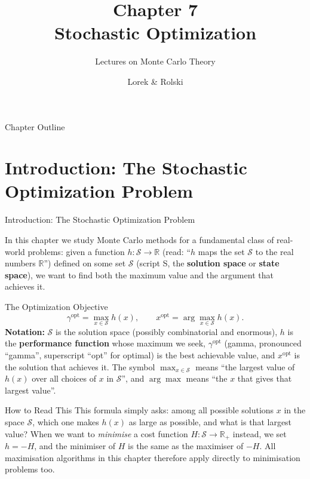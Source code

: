 \documentclass[aspectratio=169,10pt]{beamer}
\title[Ch.7 Stochastic Optimization]{Chapter 7\\Stochastic Optimization}
\subtitle{Lectures on Monte Carlo Theory}
\author{Lorek \& Rolski}
\date{}
\newcommand{\R}{\mathbb{R}}
\newcommand{\calS}{\mathcal{S}}
\begin{document}
\begin{frame}
  \titlepage
\end{frame}

\begin{frame}{Chapter Outline}
  \tableofcontents
\end{frame}

\section{Introduction: The Stochastic Optimization Problem}

\begin{frame}[allowframebreaks]{Introduction: The Stochastic Optimization Problem}

In this chapter we study Monte Carlo methods for a fundamental class of
real-world problems: given a function $h : \calS \to \R$ (read: ``$h$ maps
the set $\calS$ to the real numbers $\R$'') defined on some set $\calS$
(script S, the \textbf{solution space} or \textbf{state space}), we want to
find both the maximum value and the argument that achieves it.

\begin{block}{The Optimization Objective}
  \[
    \gamma^{\mathrm{opt}} = \max_{x \in \calS} h(x),
    \qquad
    x^{\mathrm{opt}} = \arg\max_{x \in \calS} h(x).
  \]
  \textbf{Notation:} $\calS$ is the solution space (possibly combinatorial
  and enormous), $h$ is the \textbf{performance function} whose maximum we
  seek, $\gamma^{\mathrm{opt}}$ (gamma, pronounced ``gamma'', superscript
  ``opt'' for optimal) is the best achievable value, and $x^{\mathrm{opt}}$
  is the solution that achieves it.  The symbol $\max_{x \in \calS}$ means
  ``the largest value of $h(x)$ over all choices of $x$ in $\calS$'', and
  $\arg\max$ means ``the $x$ that gives that largest value''.
\end{block}

\begin{alertblock}{How to Read This}
  This formula simply asks: among all possible solutions $x$ in the space
  $\calS$, which one makes $h(x)$ as large as possible, and what is that
  largest value?  When we want to \emph{minimise} a cost function
  $H : \calS \to \mathbb{R}_+$ instead, we set $h = -H$, and the minimiser
  of $H$ is the same as the maximiser of $-H$.  All maximisation algorithms
  in this chapter therefore apply directly to minimisation problems too.
\end{alertblock}


\end{frame}
\end{document}
